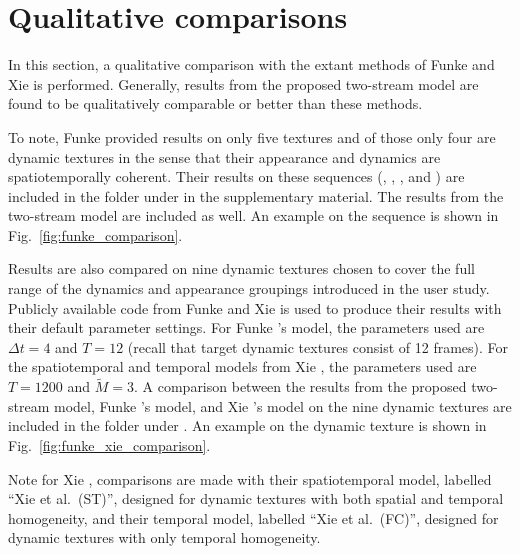 \section{Qualitative comparisons}

In this section, a qualitative comparison with the extant methods of Funke 
\etal \cite{funke2017} and Xie \etal \cite{xie2017synthesizing} is performed.
Generally, results from the proposed two-stream model are found to be qualitatively comparable or better than these methods.

To note, Funke \etal provided results on
only five textures and of those only four
are dynamic textures in the sense that their appearance
and dynamics are spatiotemporally coherent.
Their results on these sequences (, , 
, and ) are included in the folder
 under  in the supplementary material. The results from the two-stream model are included as well. An example on the  sequence is shown in Fig.\ \ref{fig:funke_comparison}.



Results are also compared on nine dynamic textures chosen to cover the full
range of the dynamics and appearance groupings introduced in the user study.
Publicly available code from Funke \etal and Xie \etal is used to produce their
results with their default parameter settings. For
Funke \etal's model, the parameters used are $\Delta{t}=4$ and
$T=12$ (recall that target dynamic textures
consist of 12 frames). For the spatiotemporal and temporal models from Xie
\etal, the parameters used are $T=1200$ and
$\tilde{M}=3$.
A comparison between the results from the proposed two-stream model, Funke
\etal's model, and Xie \etal's model
on the nine dynamic textures are included in the folder 
under . An example on the  dynamic texture is shown in Fig.\ \ref{fig:funke_xie_comparison}.

Note for Xie \etal, comparisons are made with their
spatiotemporal model, labelled ``Xie et al.\ (ST)'', designed for dynamic
textures with both spatial and temporal homogeneity, and their temporal model,
labelled ``Xie et al.\ (FC)'', designed for dynamic textures with only temporal
homogeneity.

\clearpage

\clearpage

